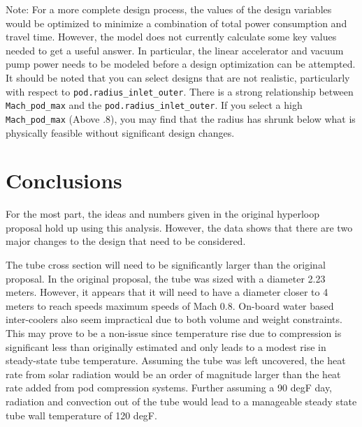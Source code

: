 \documentclass[heading.tex]{subfiles}
\begin{document}
Note: For a more complete design process, the values of the design variables would be optimized to minimize a combination of total power
consumption and travel time. However, the model does not currently calculate some key values needed to get a useful answer. In particular,
the linear accelerator and vacuum pump power needs to be modeled before a design optimization can be attempted.
It should be noted that you can select designs that are not realistic, particularly with respect to \texttt{pod.radius\_inlet\_outer}. There is
a strong relationship between \texttt{Mach\_pod\_max} and the \texttt{pod.radius\_inlet\_outer}. If you select a high 
\texttt{Mach\_pod\_max} (Above .8), you may find that the radius has shrunk below what is physically feasible without significant design
changes.


\section{Conclusions}
For the most part, the ideas and numbers given in the original hyperloop proposal hold up using this analysis. However, the data shows that
there are two major changes to the design that need to be considered.

The tube cross section will need to be significantly larger than the original proposal. In the original proposal, the tube was sized with a diameter 2.23
meters. However, it appears that it will need to have a diameter closer to 4 meters to reach speeds maximum speeds of Mach 0.8.
On-board water based inter-coolers also seem impractical due to both volume and weight constraints. This may prove to be a non-issue since
temperature rise due to compression is significant less than originally estimated and only leads to a modest rise in steady-state tube
temperature. Assuming the tube was left uncovered, the heat rate from solar radiation would be an order of magnitude larger than the heat
rate added from pod compression systems. Further assuming a 90 degF day, radiation and convection out of the tube would lead to a
manageable steady state tube wall temperature of 120 degF.

\end{document}

